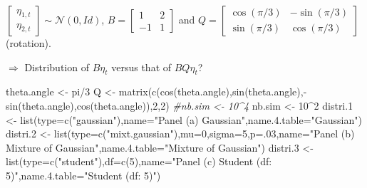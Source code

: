 \documentclass[
]{book}
\newenvironment{Shaded}{\begin{snugshade}}{\end{snugshade}}
\newcommand{\AttributeTok}[1]{\textcolor[rgb]{0.77,0.63,0.00}{#1}}
\newcommand{\CommentTok}[1]{\textcolor[rgb]{0.56,0.35,0.01}{\textit{#1}}}
\newcommand{\DecValTok}[1]{\textcolor[rgb]{0.00,0.00,0.81}{#1}}
\newcommand{\FloatTok}[1]{\textcolor[rgb]{0.00,0.00,0.81}{#1}}
\newcommand{\FunctionTok}[1]{\textcolor[rgb]{0.00,0.00,0.00}{#1}}
\newcommand{\NormalTok}[1]{#1}
\newcommand{\OtherTok}[1]{\textcolor[rgb]{0.56,0.35,0.01}{#1}}
\newcommand{\SpecialCharTok}[1]{\textcolor[rgb]{0.00,0.00,0.00}{#1}}
\newcommand{\StringTok}[1]{\textcolor[rgb]{0.31,0.60,0.02}{#1}}
\theoremstyle{definition}
\theoremstyle{definition}
\theoremstyle{definition}
\theoremstyle{definition}
\theoremstyle{remark}
\begin{document}
\(\left[\begin{array}{c}\eta_{1,t}\\ \eta_{2,t}\end{array}\right]\sim \mathcal{N}(0,Id)\),
\(B = \left[\begin{array}{cc} 1 & 2 \\ -1 & 1 \end{array}\right]\) and
\(Q = \left[\begin{array}{cc} \cos(\pi/3) & -\sin(\pi/3) \\ \sin(\pi/3) & \cos(\pi/3) \end{array}\right]\) (rotation).

\(\Rightarrow\) Distribution of \(B \eta_t\) versus that of \(BQ\eta_t\)?

\begin{Shaded}
\begin{Highlighting}[]
\NormalTok{theta.angle }\OtherTok{\textless{}{-}}\NormalTok{ pi}\SpecialCharTok{/}\DecValTok{3}
\NormalTok{Q }\OtherTok{\textless{}{-}} \FunctionTok{matrix}\NormalTok{(}\FunctionTok{c}\NormalTok{(}\FunctionTok{cos}\NormalTok{(theta.angle),}\FunctionTok{sin}\NormalTok{(theta.angle),}\SpecialCharTok{{-}}\FunctionTok{sin}\NormalTok{(theta.angle),}\FunctionTok{cos}\NormalTok{(theta.angle)),}\DecValTok{2}\NormalTok{,}\DecValTok{2}\NormalTok{)}
\CommentTok{\#nb.sim \textless{}{-} 10\^{}4}
\NormalTok{nb.sim }\OtherTok{\textless{}{-}} \DecValTok{10}\SpecialCharTok{\^{}}\DecValTok{2}
\NormalTok{distri}\FloatTok{.1} \OtherTok{\textless{}{-}} \FunctionTok{list}\NormalTok{(}\AttributeTok{type=}\FunctionTok{c}\NormalTok{(}\StringTok{"gaussian"}\NormalTok{),}\AttributeTok{name=}\StringTok{"Panel (a) Gaussian"}\NormalTok{,}\AttributeTok{name.4.table=}\StringTok{"Gaussian"}\NormalTok{)}
\NormalTok{distri}\FloatTok{.2} \OtherTok{\textless{}{-}} \FunctionTok{list}\NormalTok{(}\AttributeTok{type=}\FunctionTok{c}\NormalTok{(}\StringTok{"mixt.gaussian"}\NormalTok{),}\AttributeTok{mu=}\DecValTok{0}\NormalTok{,}\AttributeTok{sigma=}\DecValTok{5}\NormalTok{,}\AttributeTok{p=}\NormalTok{.}\DecValTok{03}\NormalTok{,}\AttributeTok{name=}\StringTok{"Panel (b) Mixture of Gaussian"}\NormalTok{,}\AttributeTok{name.4.table=}\StringTok{"Mixture of Gaussian"}\NormalTok{)}
\NormalTok{distri}\FloatTok{.3} \OtherTok{\textless{}{-}} \FunctionTok{list}\NormalTok{(}\AttributeTok{type=}\FunctionTok{c}\NormalTok{(}\StringTok{"student"}\NormalTok{),}\AttributeTok{df=}\FunctionTok{c}\NormalTok{(}\DecValTok{5}\NormalTok{),}\AttributeTok{name=}\StringTok{"Panel (c) Student (df: 5)"}\NormalTok{,}\AttributeTok{name.4.table=}\StringTok{"Student (df: 5)"}\NormalTok{)}

\end{Highlighting}
\end{Shaded}
\end{document}
